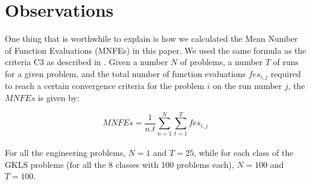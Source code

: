 
\section*{Observations}

One thing that is worthwhile to explain is how we calculated the Mean Number of Function Evaluations (MNFEs) in this paper. We used the same formula as the criteria C3 as described in \cite{ADC}. Given a number $N$ of problems, a number $T$ of runs for a given problem, and the total number of function evaluations $fes_{i, j}$ required to reach a certain convergence criteria for the problem $i$ on the run number $j$, the $MNFEs$ is given by:

$$MNFEs = \frac{1}{n.t}\sum_{n=1}^N\sum_{t=1}^Tfes_{i, j}$$\\

For all the engineering problems, $N=1$ and $T=25$, while for each class of the GKLS problems (for all the 8 classes with 100 problems each), $N=100$ and $T=100$.
